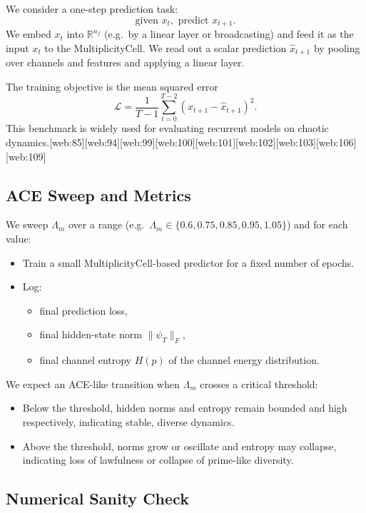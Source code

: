 \documentclass[11pt]{article}
\theoremstyle{definition}
\theoremstyle{plain}
\begin{document}
We consider a one-step prediction task:
\[
  \text{given } x_t, \text{ predict } x_{t+1}.
\]
We embed $x_t$ into $\mathbb{R}^{n_f}$ (e.g.\ by a linear layer or broadcasting) and feed it as the input $x_t$ to the MultiplicityCell.
We read out a scalar prediction $\hat{x}_{t+1}$ by pooling over channels and features and applying a linear layer.

The training objective is the mean squared error
\[
  \mathcal{L} = \frac{1}{T-1}\sum_{t=0}^{T-2} (x_{t+1} - \hat{x}_{t+1})^2.
\]
This benchmark is widely used for evaluating recurrent models on chaotic dynamics.[web:85][web:94][web:99][web:100][web:101][web:102][web:103][web:106][web:109]

\subsection{ACE Sweep and Metrics}

We sweep $\Lambda_m$ over a range (e.g.\ $\Lambda_m \in \{0.6, 0.75, 0.85, 0.95, 1.05\}$) and for each value:
\begin{itemize}[leftmargin=*]
  \item Train a small MultiplicityCell-based predictor for a fixed number of epochs.
  \item Log:
    \begin{itemize}
      \item final prediction loss,
      \item final hidden-state norm $\|\psi_T\|_F$,
      \item final channel entropy $H(p)$ of the channel energy distribution.
    \end{itemize}
\end{itemize}

We expect an ACE-like transition when $\Lambda_m$ crosses a critical threshold:
\begin{itemize}[leftmargin=*]
  \item Below the threshold, hidden norms and entropy remain bounded and high respectively, indicating stable, diverse dynamics.
  \item Above the threshold, norms grow or oscillate and entropy may collapse, indicating loss of lawfulness or collapse of prime-like diversity.
\end{itemize}

\subsection{Numerical Sanity Check}
\end{document}
